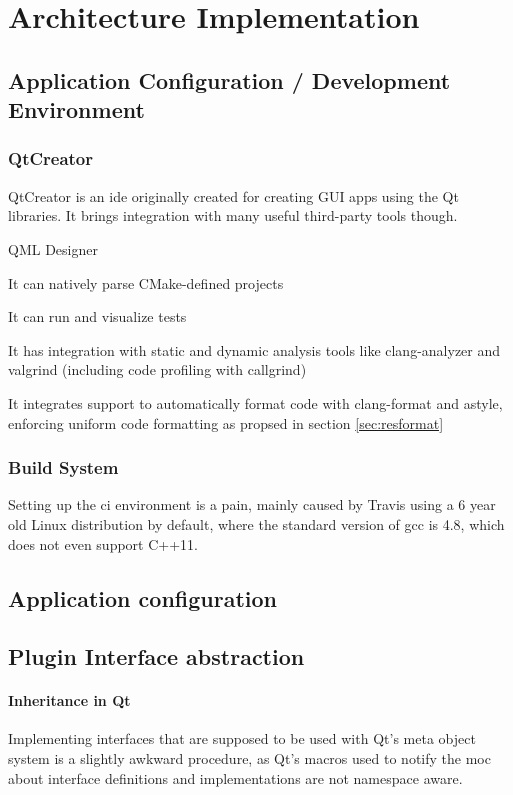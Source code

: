 \chapter{Architecture Implementation}
\section{Application Configuration / Development Environment}
\subsection{QtCreator}

QtCreator is an \gls{ide} originally created for creating GUI apps using the Qt libraries. It brings integration with many useful third-party tools though.

QML Designer

It can natively parse CMake-defined projects

It can run and visualize tests

It has integration with static and dynamic analysis tools like clang-analyzer and valgrind (including code profiling with callgrind)

It integrates support to automatically format code with clang-format and astyle, enforcing uniform code formatting as propsed in section \ref{sec:resformat}


\subsection{Build System}
Setting up the \gls{ci} environment is a pain, mainly caused by Travis using a 6 year old Linux distribution by default, where the standard version of gcc is 4.8, which does not even support C++11.



\section{Application configuration}

\section{Plugin Interface abstraction}
\subsubsection{Inheritance in Qt}
Implementing interfaces that are supposed to be used with Qt's meta object system is a slightly awkward procedure, as Qt's macros used to notify the moc about interface definitions and implementations are not namespace aware. 

